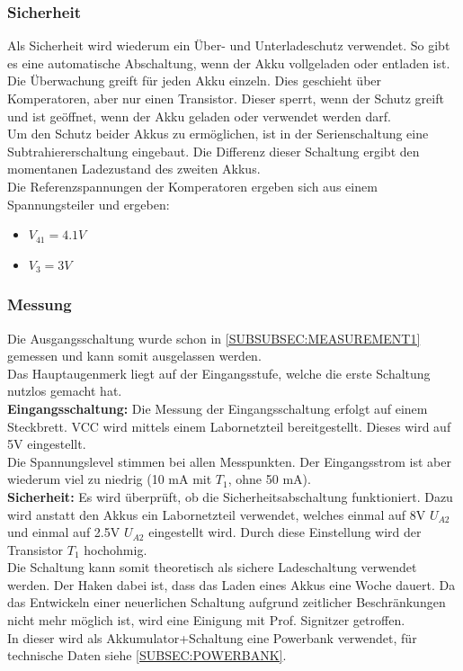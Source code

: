 \documentclass[12pt,a4paper]{article}
\begin{document}
{\subsubsection{Sicherheit}
\label{SUBSUBSEC:Security2}

Als Sicherheit wird wiederum ein Über- und Unterladeschutz verwendet. So gibt es eine automatische Abschaltung, wenn der Akku vollgeladen oder entladen ist. Die Überwachung greift für jeden Akku einzeln. Dies geschieht über Komperatoren, aber nur einen Transistor. Dieser sperrt, wenn der Schutz greift und ist geöffnet, wenn der Akku geladen oder verwendet werden darf. \\
Um den Schutz beider Akkus zu ermöglichen, ist in der Serienschaltung eine Subtrahiererschaltung eingebaut. Die Differenz dieser Schaltung ergibt den momentanen Ladezustand des zweiten Akkus.\\
Die Referenzspannungen der Komperatoren ergeben sich aus einem Spannungsteiler und ergeben:
\begin{itemize}
	\item{$V_{41} = 4.1V$}
	\item{$V_3 = 3V$}
\end{itemize}
\subsubsection{Messung}
\label{SUBSUBSEC:MEASUREMENT2}

Die Ausgangsschaltung wurde schon in \ref{SUBSUBSEC:MEASUREMENT1} gemessen und kann somit ausgelassen werden.  \\
Das Hauptaugenmerk liegt auf der Eingangsstufe, welche die erste Schaltung nutzlos gemacht hat. \\[1ex]
\textbf{Eingangsschaltung: }Die Messung der Eingangsschaltung erfolgt auf einem Steckbrett. VCC wird mittels einem Labornetzteil bereitgestellt. Dieses wird auf 5V eingestellt. \\
Die Spannungslevel stimmen bei allen Messpunkten. Der Eingangsstrom ist aber wiederum viel zu niedrig (10 mA mit $T_1$, ohne 50 mA). \\
\textbf{Sicherheit:} Es wird überprüft, ob die Sicherheitsabschaltung funktioniert. Dazu wird anstatt den Akkus ein Labornetzteil verwendet, welches einmal auf 8V $U_{A2}$ und einmal auf 2.5V $U_{A2}$ eingestellt wird. Durch diese Einstellung wird der Transistor $T_1$ hochohmig. \\
Die Schaltung kann somit theoretisch als sichere Ladeschaltung verwendet werden. Der Haken dabei ist, dass das Laden eines Akkus eine Woche dauert. Da das Entwickeln einer neuerlichen Schaltung aufgrund zeitlicher Beschränkungen nicht mehr möglich ist, wird eine Einigung mit Prof. Signitzer getroffen. \\
In dieser wird als Akkumulator+Schaltung eine Powerbank verwendet, für technische Daten siehe \ref{SUBSEC:POWERBANK}.

}
\end{document}
